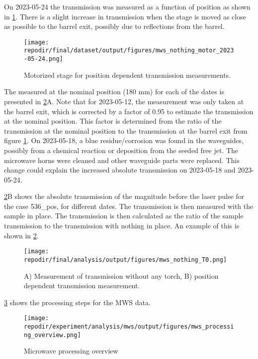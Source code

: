 On 2023-05-24 the transmission was measured as a function of position as shown in \ref{fig:SI_MWS_nothing_motor}. There is a slight increase in transmission when the stage is moved as close as possible to the barrel exit, possibly due to reflections from the barrel.


\begin{figure}
\centering
\texttt{[image: \\repodir/final/dataset/output/figures/mws\_nothing\_motor\_2023-05-24.png]}
\caption{Motorized stage for position dependent transmission measurements.}
\label{fig:SI_MWS_nothing_motor}
\end{figure}


The  measured at the nominal position (180 mm) for each of the dates is presented in \ref{fig:SI_MWS_nothing_T0}A. Note that for 2023-05-12, the measurement was only taken at the barrel exit, which is corrected by a factor of 0.95 to estimate the transmission at the nominal position. This factor is determined from the ratio of the transmission at the nominal position to the transmission at the barrel exit from figure \ref{fig:SI_MWS_nothing_motor}. On 2023-05-18, a blue residue/corrosion was found in the waveguides, possibly from a chemical reaction or deposition from the seeded free jet. The microwave horns were cleaned and other waveguide parts were replaced. This change could explain the increased absolute transmission on 2023-05-18 and 2023-05-24.  

\ref{fig:SI_MWS_nothing_T0}B shows the absolute transmission of the magnitude before the laser pulse for the case 536\_pos, for different dates. The transmission is then measured with the sample in place. The transmission is then calculated as the ratio of the sample transmission to the transmission with nothing in place. An example of this is shown in \ref{fig:SI_MWS_nothing_T0}.  


\begin{figure}[]
\centering
\texttt{[image: \\repodir/final/analysis/output/figures/mws\_nothing\_T0.png]}
\caption{A) Measurement of transmission without any torch, B) position dependent transmission measurement.}
\label{fig:SI_MWS_nothing_T0}
\end{figure}


\ref{fig:SI_mws_processing_overview} shows the processing steps for the MWS data. 

\begin{figure}[]
\centering
\texttt{[image: \\repodir/experiment/analysis/mws/output/figures/mws\_processing\_overview.png]}
\caption{Microwave processing overview}
\label{fig:SI_mws_processing_overview}
\end{figure}


